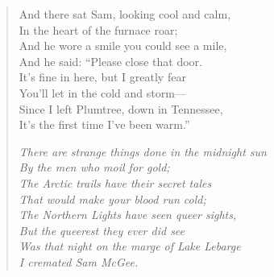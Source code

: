 \begin{verse}
And there sat Sam, looking cool and calm,\\
\hspace*{2em}In the heart of the furnace roar;\\
And he wore a smile you could see a mile,\\
\hspace*{2em}And he said: “Please close that door.\\
It’s fine in here, but I greatly fear\\
\hspace*{2em}You’ll let in the cold and storm—\\
Since I left Plumtree, down in Tennessee,\\
\hspace*{2em}It’s the first time I’ve been warm.”

\textit{
There are strange things done in the midnight sun\\
\hspace*{2em}By the men who moil for gold;\\
The Arctic trails have their secret tales\\
\hspace*{2em}That would make your blood run cold;\\
The Northern Lights have seen queer sights,\\
\hspace*{2em}But the queerest they ever did see\\
Was that night on the marge of Lake Lebarge\\
\hspace*{2em}I cremated Sam McGee.
}

\end{verse}
